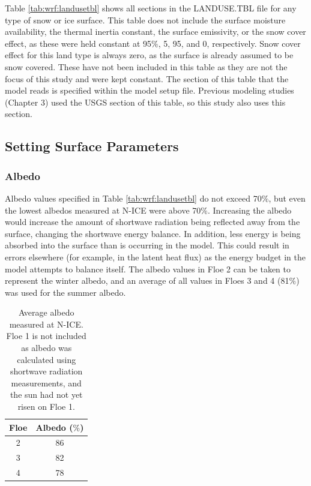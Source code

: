 Table \ref{tab:wrf:landusetbl} shows all sections in the LANDUSE.TBL file for any type of snow or ice surface. This table does not include the surface moisture availability, the thermal inertia constant, the surface emissivity, or the snow cover effect, as these were held constant at 95$\%$, 5, 95, and 0, respectively. Snow cover effect for this land type is always zero, as the surface is already assumed to be snow covered. These have not been included in this table as they are not the focus of this study and were kept constant. The section of this table that the model reads is specified within the model setup file. Previous modeling studies (Chapter 3) used the USGS section of this table, so this study also uses this section.

\subsection{Setting Surface Parameters}
\subsubsection{Albedo}
Albedo values specified in Table \ref{tab:wrf:landusetbl} do not exceed 70$\%$, but even the lowest albedos measured at N-ICE were above 70$\%$. Increasing the albedo would increase the amount of shortwave radiation being reflected away from the surface, changing the shortwave energy balance. In addition, less energy is being absorbed into the surface than is occurring in the model. This could result in errors elsewhere (for example, in the latent heat flux) as the energy budget in the model attempts to balance itself. The albedo values in Floe 2 can be taken to represent the winter albedo, and an average of all values in Floes 3 and 4 (81$\%$) was used for the summer albedo.

\begin{table}[t]
\centering
\footnotesize
\doublespacing 
{
\begin{tabular}{| c | c |}
 \hline
\rowcolor[HTML]{F3F3F3} \textbf{Floe} & \textbf{Albedo ($\%$)} \\
\hline
2 & 86 \\
3 & 82 \\
4 & 78 \\
 \hline
\end{tabular}}
\caption[N-ICE average measured albedo.]{Average albedo measured at N-ICE. Floe 1 is not included as albedo was calculated using shortwave radiation measurements, and the sun had not yet risen on Floe 1.}
\label{tab:albedos}
\end{table}

